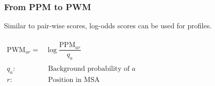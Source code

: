%
%
\subsubsection*{From PPM to PWM}
Similar to pair-wise scores, log-odds scores can be used for profiles. \\ \\

$\begin{aligned}
\mathrm{PWM}_{ar} =& \log \dfrac{\mathrm{PPM}_{ar}}{q_a} \\ \\
q_a :& \text{ Background probability of } a \\
r :& \text{ Position in MSA}  
\end{aligned} $

\bigskip 

%
